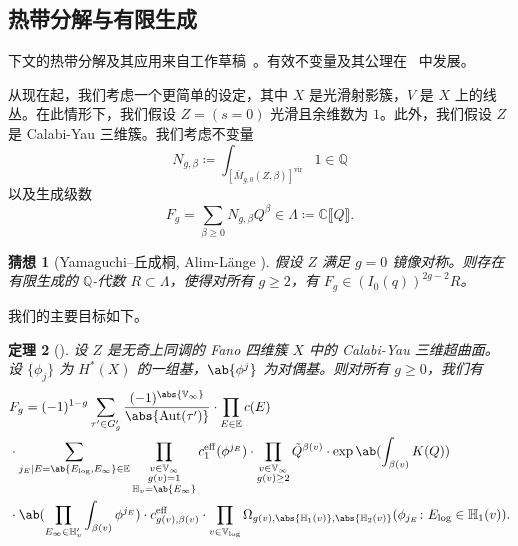 \documentclass{amsart}
\newtheorem{thm}{定理}[section]
\newtheorem{conj}[thm]{猜想}
\theoremstyle{definition}
\theoremstyle{remark}
\theoremstyle{plain}
\theoremstyle{definition}
\theoremstyle{remark}
\newcommand{\C}{\mathbb{C}}
\newcommand{\Q}{\mathbb{Q}}
\newcommand{\E}{\mathbb{E}}
\newcommand{\V}{\mathbb{V}}
\renewcommand{\H}{\mathbb{H}}
\newcommand{\mr}[1]{\mathrm{#1}}
\newcommand{\on}[1]{\operatorname{#1}}
\newcommand{\1}{\mathbf{1}}
\newcommand{\2}{\mathbf{2}}
\newcommand{\3}{\mathbf{3}}
\newcommand{\vir}{\mr{vir}}
\newcommand{\ps}[1]{\llbracket #1 \rrbracket}
\DeclareMathOperator{\Aut}{Aut}
\begin{document}
\subsection{热带分解与有限生成}%
\label{sub:Tropical decomposition and finite generation}

下文的热带分解及其应用来自工作草稿~\cite{CJRtropical2025}。有效不变量及其公理在~\cite{CJRpunctured} 中发展。

从现在起，我们考虑一个更简单的设定，其中 \(X\) 是光滑射影簇，\(V\) 是 \(X\) 上的线丛。在此情形下，我们假设 \(Z = (s = 0)\) 光滑且余维数为 \(1\)。此外，我们假设 \(Z\) 是 Calabi-Yau 三维簇。我们考虑不变量
\[ N_{g, \beta} \coloneqq \int_{[\bar{M}_{g,0}(Z, \beta)]^{\vir}} 1 \in \Q \]
以及生成级数
\[ F_g = \sum_{\beta \geq 0} N_{g, \beta} Q^{\beta} \in \Lambda \coloneqq \C \ps{Q}. \]

\begin{conj}[Yamaguchi–丘成桐, Alim-L\"ange {\cite{YY2004,AlimLange2007}}]
    假设 \(Z\) 满足 \(g=0\) 镜像对称。则存在有限生成的 \(\Q\)-代数 \(R \subset \Lambda\)，使得对所有 \(g \geq 2\)，有 \(F_g \in (I_0(q))^{2g-2} R\)。
\end{conj}

我们的主要目标如下。

\begin{thm}[{\cite{CJRtropical2025}}]
    设 \(Z\) 是无奇上同调的 Fano 四维簇 \(X\) 中的 Calabi-Yau 三维超曲面。设 \(\{\phi_j\}\) 为 \(H^*(X)\) 的一组基，\(\ab\{\phi^j\}\) 为对偶基。则对所有 \(g \geq 0\)，我们有
    \begin{align*}
        &F_g = (-1)^{1-g} \sum_{\tau' \in G_g'} \frac{(-1)^{\abs{\V_{\infty}}}}{\abs{\Aut(\tau')}} \cdot \prod_{E \in \E} c(E) \\
        & \cdot \sum_{j_E \mid E = \ab\{E_{\log}, E_{\infty}\} \in \E} \prod_{\substack{v \in \V_{\infty} \\ g(v)=1 \\ \H_v = \ab\{E_{\infty}\}}} c_1^{\mr{eff}}(\phi^{j_E}) \cdot \prod_{\substack{v \in \V_{\infty} \\ g(v) \geq 2}} \tilde{Q}^{\beta(v)} \cdot \exp \ab(\int_{\beta(v)} K(Q) )  \\
        & \cdot \ab(\prod_{E_{\infty} \in \H_v'}\int_{\beta(v)} \phi^{j_E}) \cdot c_{g(v), \beta(v)}^{\on{eff}} 
         \cdot \prod_{v \in \V_{\log}} \Omega_{g(v), \abs{\H_1(v)}, \abs{\H_2(v)}} (\phi_{j_E} \colon E_{\log} \in \H_1(v)).
    \end{align*}
\end{thm}
\end{document}
